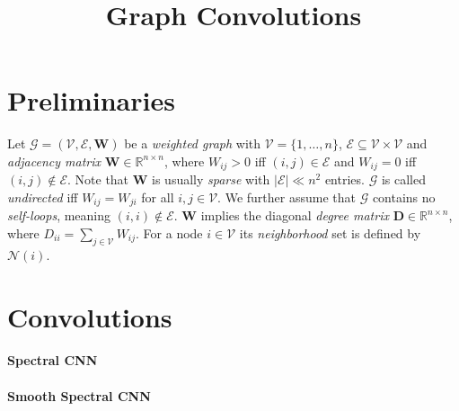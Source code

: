 \documentclass[pdftex,10pt,a4paper]{scrartcl}
\title{Graph Convolutions}
\date{\vspace{-5ex}}
\begin{document}
\maketitle

\section{Preliminaries}

Let $\mathcal{G} = (\mathcal{V}, \mathcal{E}, \mathbf{W})$ be a \emph{weighted graph} with $\mathcal{V} = \{1, \ldots, n\}$, $\mathcal{E} \subseteq \mathcal{V} \times \mathcal{V}$ and \emph{adjacency matrix} $\mathbf{W} \in \mathbb{R}^{n \times n}$, where $W_{ij} > 0$ iff $(i, j) \in \mathcal{E}$ and $W_{ij} = 0$ iff $(i, j) \not\in \mathcal{E}$.
Note that $\mathbf{W}$ is usually \emph{sparse} with $|\mathcal{E}| \ll n^2$ entries.
$\mathcal{G}$ is called \emph{undirected} iff $W_{ij} = W_{ji}$ for all $i,j \in \mathcal{V}$.
We further assume that $\mathcal{G}$ contains no \emph{self-loops}, meaning $(i, i) \not\in \mathcal{E}$.
$\mathbf{W}$ implies the diagonal \emph{degree matrix} $\mathbf{D} \in \mathbb{R}^{n \times n}$, where $D_{ii} = \sum_{j \in \mathcal{V}} W_{ij}$.
For a node $i \in \mathcal{V}$ its \emph{neighborhood} set is defined by $\mathcal{N}(i)$.





\section{Convolutions}

\paragraph{Spectral CNN}

\paragraph{Smooth Spectral CNN}
\end{document}
